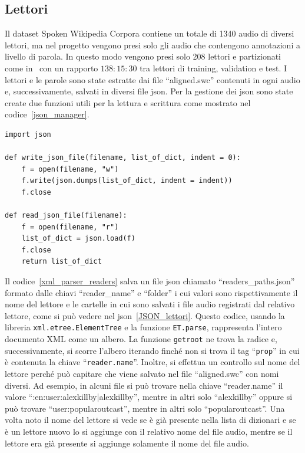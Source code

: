 \documentclass[12pt,a4paper,titlepage]{article}
\begin{document}
\subsection{Lettori}
\label{subsec:lettori}
Il dataset Spoken Wikipedia Corpora contiene un totale di 1340 audio di diversi lettori, ma nel progetto vengono presi solo gli audio che contengono annotazioni a livello di parola. In questo modo vengono presi solo 208 lettori e partizionati come in~\cite{Salamon:Few-Shot} con un rapporto $138:15:30$ tra lettori di training, validation e test. I lettori e le parole sono state estratte dai file ``aligned.swc'' contenuti in ogni audio e, successivamente, salvati in diversi file json. Per la gestione dei json sono state create due funzioni utili per la lettura e scrittura come mostrato nel codice~\ref{json_manager}.
\begin{lstlisting}[language=iPython,firstnumber=1, caption=json\_manager.py, label=json_manager,captionpos=b]
import json
	
def write_json_file(filename, list_of_dict, indent = 0):
	f = open(filename, "w")
	f.write(json.dumps(list_of_dict, indent = indent))
	f.close
	
def read_json_file(filename):
	f = open(filename, "r")
	list_of_dict = json.load(f)
	f.close
	return list_of_dict
\end{lstlisting}

Il codice~\ref{xml_parser_readers} salva un file json chiamato ``readers\_paths.json'' formato dalle chiavi ``reader\_name'' e ``folder'' i cui valori sono rispettivamente il nome del lettore e le cartelle in cui sono salvati i file audio registrati dal relativo lettore, come si può vedere nel json~\ref{JSON_lettori}. Questo codice, usando la libreria \texttt{xml.etree.ElementTree} e la funzione \texttt{ET.parse}, rappresenta l'intero documento XML come un albero. La funzione \texttt{getroot} ne trova la radice e, successivamente, si scorre l'albero iterando finché non si trova il tag ``\texttt{prop}'' in cui è contenuta la chiave ``\texttt{reader.name}''. Inoltre, si effettua un controllo sul nome del lettore perché può capitare che viene salvato nel file ``aligned.swc'' con nomi diversi. Ad esempio, in alcuni file si può trovare nella chiave ``reader.name'' il valore ``:en:user:alexkillby|alexkillby'', mentre in altri solo ``alexkillby'' oppure si può trovare ``user:popularoutcast'', mentre in altri solo ``popularoutcast''. Una volta noto il nome del lettore si vede se è già presente nella lista di dizionari e se è un lettore nuovo lo si aggiunge con il relativo nome del file audio, mentre se il lettore era già presente si aggiunge solamente il nome del file audio.
\end{document}
